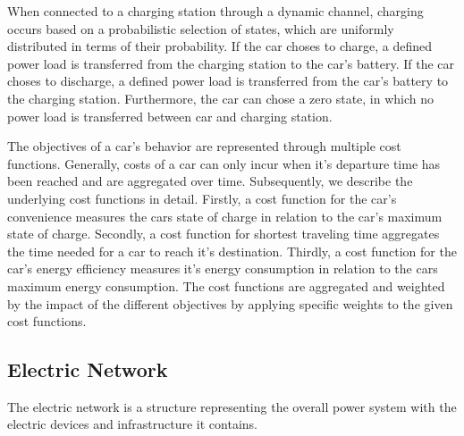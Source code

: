 \begin{itemize}
	When connected to a charging station through a dynamic channel, charging occurs based on a probabilistic selection of states, which are uniformly distributed in terms of their probability. If the car choses to charge, a defined power load is transferred from the charging station to the car's battery. If the car choses to discharge, a defined power load is transferred from the car's battery to the charging station. Furthermore, the car can chose a zero state, in which no power load is transferred between car and charging station.
	
	The objectives of a car's behavior are represented through multiple cost functions. Generally, costs of a car can only incur when it's departure time has been reached and are aggregated over time. Subsequently, we describe the underlying cost functions in detail. Firstly, a cost function for the car's convenience measures the cars state of charge in relation to the car's maximum state of charge. Secondly, a cost function for shortest traveling time aggregates the time needed for a car to reach it's destination. Thirdly, a cost function for the car's energy efficiency measures it's energy consumption in relation to the cars maximum energy consumption. The cost functions are aggregated and weighted by the impact of the different objectives by applying specific weights to the given cost functions.
\end{itemize}

\subsection{Electric Network}

The electric network is a structure representing the overall power system with the electric devices and infrastructure it contains.

